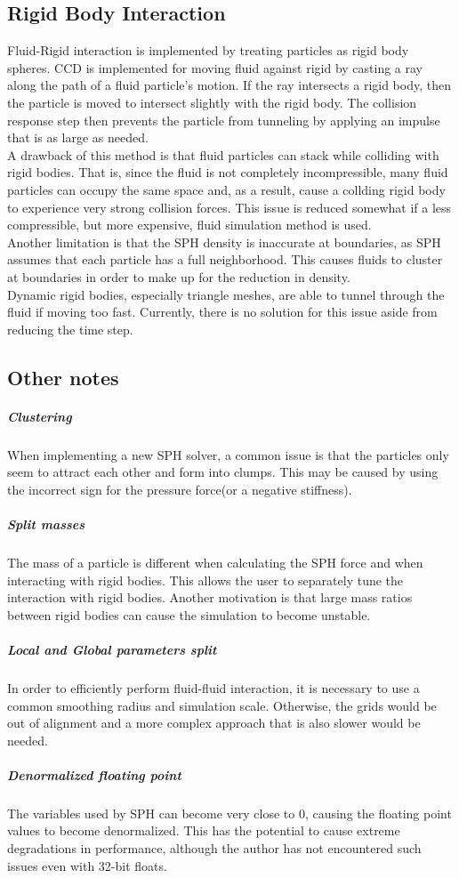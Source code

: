 \documentclass[]{article}
\begin{document}
	\subsection{Rigid Body Interaction}
		Fluid-Rigid interaction is implemented by treating particles as rigid body spheres.
		CCD is implemented for moving fluid against rigid by casting a ray along the path of
		a fluid particle's motion. If the ray intersects a rigid body, then the particle is moved
		to intersect slightly with the rigid body. The collision response step then prevents the particle
		from tunneling by applying an impulse that is as large as needed.\\
		
		A drawback of this method is that fluid particles can stack while colliding with rigid bodies.
		That is, since the fluid is not completely incompressible, many fluid particles can occupy the same
		space and, as a result, cause a collding rigid body to experience very strong collision forces. This issue is
		reduced somewhat if a less compressible, but more expensive, fluid simulation method is used.\\
		
		Another limitation is that the SPH density is inaccurate at boundaries, as SPH assumes that
		each particle has a full neighborhood. This causes fluids to cluster at boundaries in order to make 
		up for the reduction in density.\\
		
		Dynamic rigid bodies, especially triangle meshes, are able to tunnel through the fluid
		if moving too fast. Currently, there is no solution for this issue aside from reducing the
		time step.
	
	\subsection{Other notes}		
		\subparagraph{Clustering}
			When implementing a new SPH solver, a common issue is that the particles only seem to attract each other 
			and form into clumps. This may be caused by using the incorrect sign for the pressure force(or a negative 
			stiffness).
		\subparagraph{Split masses}
			The mass of a particle is different when calculating the SPH force and when interacting with rigid bodies.
			This allows the user to separately tune the interaction with rigid bodies. Another motivation is that large
			mass ratios between rigid bodies can cause the simulation to become unstable.
		\subparagraph{Local and Global parameters split}
			In order to efficiently perform fluid-fluid interaction, it is necessary to use a common smoothing radius 
			and simulation scale. Otherwise, the grids would be out of alignment and a more complex approach that is 
			also slower would be needed.
		\subparagraph{Denormalized floating point}
			The variables used by SPH can become very close to 0, causing the floating point values to become 
			denormalized. This has the potential to cause extreme degradations in performance, although the author has 
			not encountered such issues even with 32-bit floats.
\end{document}
